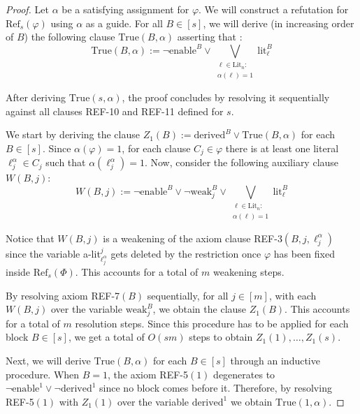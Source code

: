 \begin{proof}
    Let $\alpha$ be a satisfying assignment for $\varphi$. We will construct a refutation for $\mathrm{Ref}_s(\varphi)$ using $\alpha$ as a guide. For all $B \in [s]$, we will derive (in increasing order of $B$) the following clause $\mathrm{True}(B,\alpha)$ asserting that :
    \begin{equation}
        \mathrm{True}(B,\alpha) := \lnot \text{enable}^B \lor \bigvee_{\substack{\ell \in \mathrm{Lit}_n :\\ \alpha(\ell) = 1}} \text{lit}^B_{\ell}
    \end{equation}

    \noindent
    After deriving $\mathrm{True}(s,\alpha)$, the proof concludes by resolving it sequentially against all clauses REF-10 and REF-11 defined for $s$.

    We start by deriving the clause $Z_1(B) := \mathrm{derived}^B \lor \mathrm{True}(B,\alpha)$ for each $B \in [s]$. Since $\alpha(\varphi) = 1$, for each clause $C_j \in \varphi$ there is at least one literal $\ell_j^\alpha \in C_j$ such that $\alpha(\ell_j^{\alpha}) = 1$. Now, consider the following auxiliary clause $W(B,j)$:
    \begin{equation}
        W(B,j) := \lnot \text{enable}^B \lor \lnot \text{weak}^B_j \lor \bigvee_{\substack{\ell \in \mathrm{Lit}_n :\\ \alpha(\ell) = 1}} \text{lit}^B_{\ell}
    \end{equation}

    Notice that $W(B,j)$ is a weakening of the axiom clause REF-3$(B,j,\ell_j^\alpha)$ since the variable a-lit$^j_{\ell_j^\alpha}$ gets deleted by the restriction once $\varphi$ has been fixed inside $\mathrm{Ref}_s(\Phi)$. This accounts for a total of $m$ weakening steps.

    By resolving axiom REF-7$(B)$ sequentially, for all $j \in [m]$, with each $W(B,j)$ over the variable $\mathrm{weak}_{j}^B$, we obtain the clause $Z_1(B)$. This accounts for a total of $m$ resolution steps. Since this procedure has to be applied for each block $B \in [s]$, we get a total of $O(sm)$ steps to obtain $Z_1(1), \ldots, Z_1(s)$.
    
    Next, we will derive $\mathrm{True}(B,\alpha)$ for each $B \in [s]$ through an inductive procedure. When $B = 1$, the axiom REF-5$(1)$ degenerates to $\lnot \mathrm{enable}^1 \lor \lnot \mathrm{derived}^1$ since no block comes before it. Therefore, by resolving REF-5$(1)$ with $Z_1(1)$ over the variable $\mathrm{derived}^1$ we obtain $\mathrm{True}(1,\alpha)$.
    

\end{proof}
